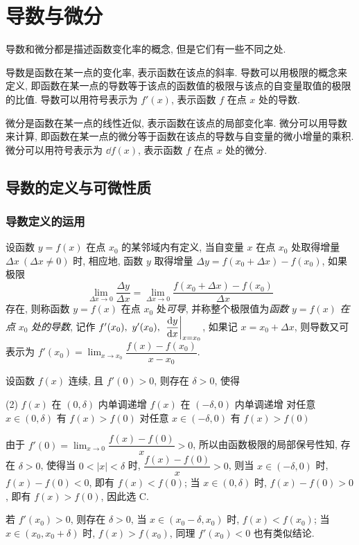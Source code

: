 \section{导数与微分}

导数和微分都是描述函数变化率的概念, 但是它们有一些不同之处.

导数是函数在某一点的变化率, 表示函数在该点的斜率.
导数可以用极限的概念来定义, 即函数在某一点的导数等于该点的函数值的极限与该点的自变量取值的极限的比值.
导数可以用符号表示为 $f'(x)$, 表示函数 $f$ 在点 $x$ 处的导数.

微分是函数在某一点的线性近似, 表示函数在该点的局部变化率.
微分可以用导数来计算, 即函数在某一点的微分等于函数在该点的导数与自变量的微小增量的乘积.
微分可以用符号表示为 $\dd f(x)$, 表示函数 $f$ 在点 $x$ 处的微分.

\subsection{导数的定义与可微性质}

\subsubsection{导数定义的运用}

\begin{definition}[导数]
    设函数 $y=f(x)$ 在点 $x_0$ 的某邻域内有定义, 当自变量 $x$ 在点 $x_0$ 处取得增量 $\Delta x~(\Delta x\neq 0)$ 时, 相应地, 函数 $y$ 取得增量 $\Delta y=f(x_0+\Delta x)-f(x_0)$, 如果极限
    \label{theDefinitionOfTheDerivationFunction}
    $$\lim_{\Delta x\to0}\dfrac{\Delta y}{\Delta x}=\lim_{\Delta x\to0}\dfrac{f(x_0+\Delta x)-f(x_0)}{\Delta x}$$
    存在, 则称函数 $y=f(x)$ 在点 $x_0$ 处\textit{可导}, 并称整个极限值为\textit{函数} $y=f(x)$ \textit{在点} $x_0$ \textit{处的导数}, 记作 $f'(x_0),~y'(x_0),~\eval{\dfrac{\dd y}{\dd x}}_{x=x_0}$,
    如果记 $x=x_0+\Delta x$, 则导数又可表示为 $f'(x_0)=\displaystyle\lim_{x\to x_0}\dfrac{f(x)-f(x_0)}{x-x_0}.$
\end{definition}

\begin{example}[2004 数一]
    设函数 $f(x)$ 连续, 且 $f'(0)>0$, 则存在 $\delta>0$, 使得
    \begin{tasks}(2)
        \task $f(x)$ 在 $(0,\delta)$ 内单调递增
        \task $f(x)$ 在 $(-\delta,0)$ 内单调递增
        \task 对任意 $x\in(0,\delta)$ 有 $f(x)>f(0)$
        \task 对任意 $x\in(-\delta,0)$ 有 $f(x)>f(0)$
    \end{tasks}
\end{example}
\begin{solution}
    由于 $f'(0)=\displaystyle\lim_{x\to0}\dfrac{f(x)-f(0)}{x}>0$, 所以由函数极限的局部保号性知, 存在 $\delta>0$, 使得当 $0<|x|<\delta$ 时, $\dfrac{f(x)-f(0)}{x}>0$,
    则当 $x\in(-\delta,0)$ 时, $f(x)-f(0)<0$, 即有 $f(x)<f(0)$; 当 $x\in(0,\delta)$ 时, $f(x)-f(0)>0$, 即有 $f(x)>f(0)$, 因此选 C.
\end{solution}
\begin{inference}
    若 $f'(x_0)>0$, 则存在 $\delta>0$, 当 $x\in(x_0-\delta,x_0)$ 时, $f(x)<f(x_0)$; 当 $x\in(x_0,x_0+\delta)$ 时, $f(x)>f(x_0)$, 同理 $f'(x_0)<0$ 也有类似结论.
\end{inference}

